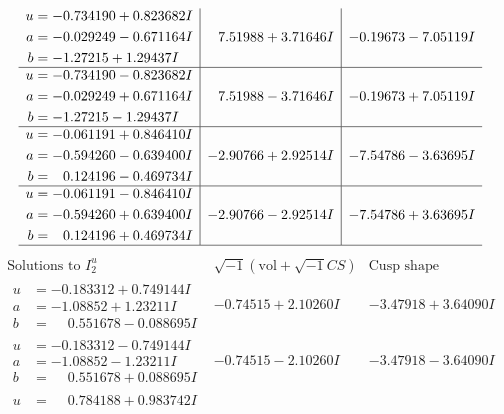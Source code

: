 \documentclass[1p]{elsarticle_modified}
\theoremstyle{definition}
\newcommand{\I}{\sqrt{-1}}
\begin{document}
$$\begin{array}{c|c|c}
\begin{aligned}
u &= -0.734190 + 0.823682 I \\
a &= -0.029249 - 0.671164 I \\
b &= -1.27215 + 1.29437 I\end{aligned}
 & \phantom{-}7.51988 + 3.71646 I & -0.19673 - 7.05119 I \\ \hline\begin{aligned}
u &= -0.734190 - 0.823682 I \\
a &= -0.029249 + 0.671164 I \\
b &= -1.27215 - 1.29437 I\end{aligned}
 & \phantom{-}7.51988 - 3.71646 I & -0.19673 + 7.05119 I \\ \hline\begin{aligned}
u &= -0.061191 + 0.846410 I \\
a &= -0.594260 - 0.639400 I \\
b &= \phantom{-}0.124196 - 0.469734 I\end{aligned}
 & -2.90766 + 2.92514 I & -7.54786 - 3.63695 I \\ \hline\begin{aligned}
u &= -0.061191 - 0.846410 I \\
a &= -0.594260 + 0.639400 I \\
b &= \phantom{-}0.124196 + 0.469734 I\end{aligned}
 & -2.90766 - 2.92514 I & -7.54786 + 3.63695 I\\
 \hline 
 \end{array}$$\newpage$$\begin{array}{c|c|c}  
\text{Solutions to }I^u_{2}& \I (\text{vol} + \sqrt{-1}CS) & \text{Cusp shape}\\
 \hline 
\begin{aligned}
u &= -0.183312 + 0.749144 I \\
a &= -1.08852 + 1.23211 I \\
b &= \phantom{-}0.551678 - 0.088695 I\end{aligned}
 & -0.74515 + 2.10260 I & -3.47918 + 3.64090 I \\ \hline\begin{aligned}
u &= -0.183312 - 0.749144 I \\
a &= -1.08852 - 1.23211 I \\
b &= \phantom{-}0.551678 + 0.088695 I\end{aligned}
 & -0.74515 - 2.10260 I & -3.47918 - 3.64090 I \\ \hline\begin{aligned}
u &= \phantom{-}0.784188 + 0.983742 I \\

\end{aligned}
\end{array}$$
\end{document}
